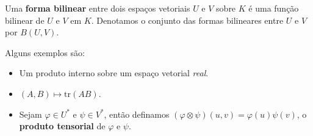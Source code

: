 \documentclass[11pt,twoside,a4paper]{book}
\begin{document}
\begin{definicao}
Uma \textbf{forma bilinear} entre dois espaços vetoriais $U$ e $V$ sobre $K$ é uma função bilinear de $U$ e $V$ em $K$. Denotamos o conjunto das formas bilineares entre $U$ e $V$ por $B(U,V)$.
\end{definicao}

\begin{exemplo}
Alguns exemplos são:
\begin{itemize}
\item Um produto interno sobre um espaço vetorial \textit{real}.
\item $(A,B)\mapsto\mathrm{tr}(AB)$.
\item Sejam $\varphi\in U^*$ e $\psi\in V^*$, então definamos $(\varphi\otimes\psi)(u,v)=\varphi(u)\psi(v)$, o \textbf{produto tensorial} de $\varphi$ e $\psi$.
\end{itemize}
\end{exemplo}

\printindex
\end{document}
